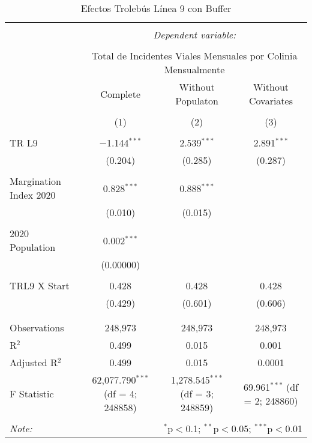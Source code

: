 
\begin{table}[!htbp] \centering 
  \caption{Efectos Trolebús Línea 9 con Buffer} 
  \label{} 
\begin{tabular}{@{\extracolsep{5pt}}lccc} 
\\[-1.8ex]\hline 
\hline \\[-1.8ex] 
 & \multicolumn{3}{c}{\textit{Dependent variable:}} \\ 
\cline{2-4} 
\\[-1.8ex] & \multicolumn{3}{c}{Total de Incidentes Viales Mensuales por Colinia Mensualmente} \\ 
 & Complete & Without Populaton & Without Covariates \\ 
\\[-1.8ex] & (1) & (2) & (3)\\ 
\hline \\[-1.8ex] 
 TR L9 & $-$1.144$^{***}$ & 2.539$^{***}$ & 2.891$^{***}$ \\ 
  & (0.204) & (0.285) & (0.287) \\ 
  & & & \\ 
 Margination Index 2020 & 0.828$^{***}$ & 0.888$^{***}$ &  \\ 
  & (0.010) & (0.015) &  \\ 
  & & & \\ 
 2020 Population & 0.002$^{***}$ &  &  \\ 
  & (0.00000) &  &  \\ 
  & & & \\ 
 TRL9 X Start & 0.428 & 0.428 & 0.428 \\ 
  & (0.429) & (0.601) & (0.606) \\ 
  & & & \\ 
\hline \\[-1.8ex] 
Observations & 248,973 & 248,973 & 248,973 \\ 
R$^{2}$ & 0.499 & 0.015 & 0.001 \\ 
Adjusted R$^{2}$ & 0.499 & 0.015 & 0.0001 \\ 
F Statistic & 62,077.790$^{***}$ (df = 4; 248858) & 1,278.545$^{***}$ (df = 3; 248859) & 69.961$^{***}$ (df = 2; 248860) \\ 
\hline 
\hline \\[-1.8ex] 
\textit{Note:}  & \multicolumn{3}{r}{$^{*}$p$<$0.1; $^{**}$p$<$0.05; $^{***}$p$<$0.01} \\ 
\end{tabular} 
\end{table} 
